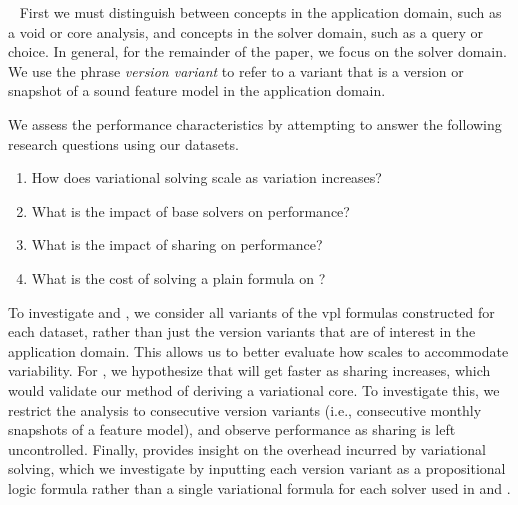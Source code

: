 ~\label{section:case-studies:experimental-methodology}
%
First we must distinguish between concepts in the application domain, such as a
void or core analysis, and concepts in the solver domain, such as a query or
choice. In general, for the remainder of the paper, we focus on the solver
domain. We use the phrase \textit{version variant} to refer to a variant that is
a version or snapshot of a sound feature model in the application domain.

We assess the performance characteristics \vsat{} by attempting to answer the
following research questions using our datasets.
%
\begin{enumerate}%
\item[\resQ{1}] How does variational solving scale as variation increases?
\item[\resQ{2}] What is the impact of base solvers on performance?
\item[\resQ{3}] What is the impact of sharing on performance?
\item[\resQ{4}] What is the cost of solving a plain formula on \vsat{}?
\end{enumerate}

To investigate  and , we consider all variants of the \ac{vpl}
formulas constructed for each dataset, rather than just the version variants
that are of interest in the application domain. This allows us to better
evaluate how \vsat{} scales to accommodate variability.
%
For , we hypothesize that \vsat{} will get faster as sharing increases,
which would validate our method of deriving a variational core. To investigate
this, we restrict the analysis to consecutive version variants (i.e.,
consecutive monthly snapshots of a feature model), and observe performance
as sharing is left uncontrolled.
%
Finally,  provides insight on the overhead incurred by variational
solving, which we investigate by inputting each version variant as a
propositional logic formula rather than a single variational formula for each
solver used in  and .

